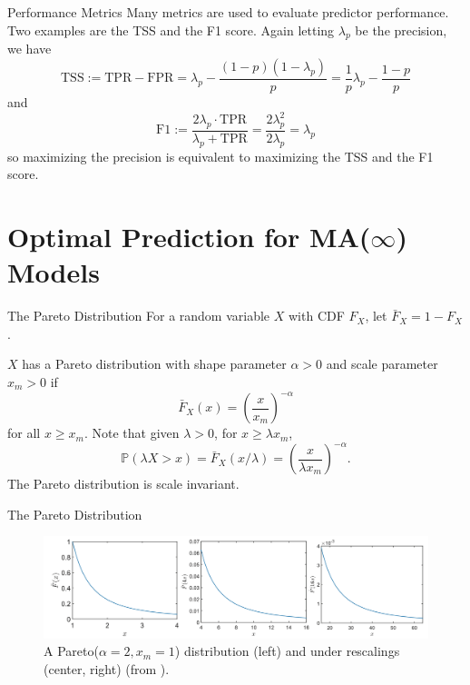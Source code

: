 \documentclass{beamer}
\def\P{\mathbb P}
\begin{document}
\begin{frame}{Performance Metrics}
    Many metrics are used to evaluate predictor performance. Two examples are the TSS and the F1 score. Again letting $\lambda_p$ be the precision, we have
    \[
    \text{TSS} := \text{TPR} - \text{FPR} = \lambda_p - \frac{(1 - p)(1 - \lambda_p)}{p} = \frac{1}{p}\lambda_p - \frac{1 - p}{p}
    \]
    and
    \[
    \text{F1} := \frac{2\lambda_p \cdot \text{TPR}}{\lambda_p + \text{TPR}} = \frac{2\lambda_p^2}{2\lambda_p} = \lambda_p
    \]
    so maximizing the precision is equivalent to maximizing the TSS and the F1 score.
\end{frame}

\section{Optimal Prediction for MA($\infty$) Models}

\begin{frame}{The Pareto Distribution}
    For a random variable $X$ with CDF $F_X$, let $\bar{F}_X = 1 - F_X$.

    \smallskip
    
    $X$ has a Pareto distribution with shape parameter $\alpha > 0$ and scale parameter $x_m > 0$ if
    \[
    \bar{F}_X(x) = \left(\frac{x}{x_m}\right)^{-\alpha}
    \]
    for all $x \ge x_m$. Note that given $\lambda > 0$, for $x \ge \lambda x_m$,
    \[
    \P(\lambda X > x) = \bar{F}_X(x / \lambda) = \left(\frac{x}{\lambda x_m}\right)^{-\alpha}.
    \]
    The Pareto distribution is scale invariant.
\end{frame}

\begin{frame}{The Pareto Distribution}
    \begin{figure}[h!]
        \centering
        \includegraphics[scale=0.3]{scaled_paretos.png}
        \caption{A Pareto($\alpha = 2, x_m = 1$) distribution (left) and under rescalings (center, right) (from \cite{nair2022thef}).}
        \label{fig:scaled_paretos}
    \end{figure}
\end{frame}
\end{document}
